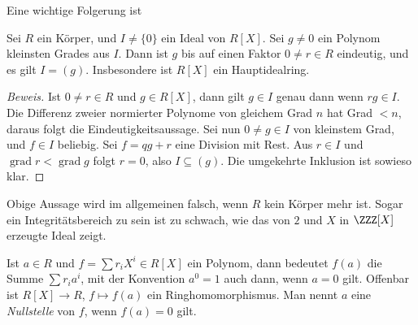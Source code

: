 \documentclass[12pt,a4paper,twoside]{article}
\newcommand{\ei}[1]{\emph{#1}\index{#1}}
\DeclareMathOperator{\grad}{grad}
\begin{document}
Eine wichtige Folgerung ist
\begin{Satz}
  Sei $R$ ein K\"orper, und $I\ne\{0\}$ ein Ideal von $R[X]$. Sei $g\ne0$ ein
  Polynom kleinsten Grades aus $I$. Dann ist $g$ bis auf einen Faktor $0\ne
  r\in R$ eindeutig, und es gilt $I=(g)$. Insbesondere ist $R[X]$ ein
  Hauptidealring.
\end{Satz}
\begin{proof}[Beweis]
  Ist $0\ne r\in R$ und $g\in R[X]$, dann gilt $g\in I$ genau dann wenn $rg\in
  I$. Die Differenz zweier normierter Polynome von gleichem Grad $n$ hat Grad
  $<n$, daraus folgt die Eindeutigkeitsaussage. Sei nun $0\ne g\in I$ von
  kleinstem Grad, und $f\in I$ beliebig. Sei $f=qg+r$ eine Division mit Rest.
  Aus $r\in I$ und $\grad r<\grad g$ folgt $r=0$, also $I\subseteq (g)$. Die
  umgekehrte Inklusion ist sowieso klar.
\end{proof}
\begin{Bemerkung*}
  Obige Aussage wird im allgemeinen falsch, wenn $R$ kein K\"orper mehr
  ist. Sogar ein Integrit\"atsbereich zu sein ist zu schwach, wie das von $2$
  und $X$ in $\ZZZ[X]$ erzeugte Ideal zeigt.
\end{Bemerkung*}
Ist $a\in R$ und $f=\sum r_iX^i\in R[X]$ ein Polynom, dann bedeutet $f(a)$ die
Summe $\sum r_ia^i$, mit der Konvention $a^0=1$ auch dann, wenn $a=0$
gilt. Offenbar ist $R[X]\to R$, $f\mapsto f(a)$ ein Ringhomomorphismus. Man
nennt $a$ eine \ei{Nullstelle} von $f$, wenn $f(a)=0$ gilt.
\end{document}
